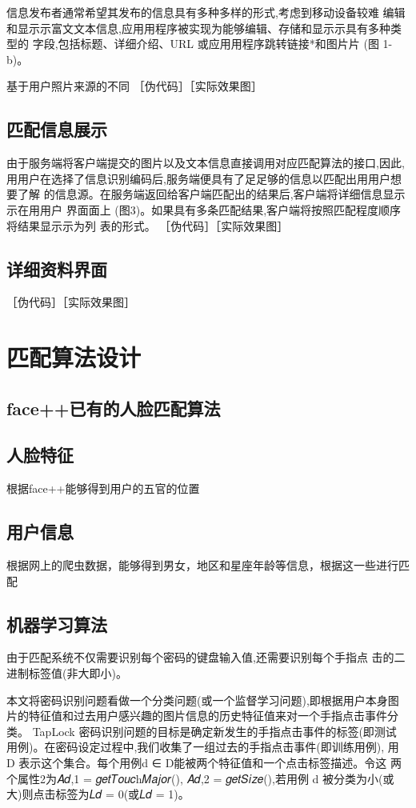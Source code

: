 信息发布者通常希望其发布的信息具有多种多样的形式,考虑到移动设备较难 编辑和显⽰示富⽂文本信息,应⽤用程序被实现为能够编辑、存储和显⽰示具有多种类型的 字段,包括标题、详细介绍、URL 或应⽤用程序跳转链接*和图⽚片 (图 1-b)。

基于用户照片来源的不同
［伪代码］［实际效果图］
\subsection{匹配信息展⽰}
由于服务端将客户端提交的图片以及文本信息直接调用对应匹配算法的接口,因此, ⽤用户在选择了信息识别编码后,服务端便具有了⾜足够的信息以匹配出⽤用户想要了解 的信息源。在服务端返回给客户端匹配出的结果后,客户端将详细信息显⽰示在⽤用户 界⾯面上 (图3)。如果具有多条匹配结果,客户端将按照匹配程度顺序将结果显⽰示为列 表的形式。
［伪代码］［实际效果图］
\subsection{详细资料界面}
［伪代码］［实际效果图］


\section{}

\section{匹配算法设计}
\subsection{face++已有的人脸匹配算法}
\subsection{人脸特征}
根据face++能够得到用户的五官的位置
\subsection{用户信息}
根据网上的爬虫数据，能够得到男女，地区和星座年龄等信息，根据这一些进行匹配
\subsection{机器学习算法}
由于匹配系统不仅需要识别每个密码的键盘输入值,还需要识别每个手指点 击的二进制标签值(非大即小)。

本文将密码识别问题看做一个分类问题(或一个监督学习问题),即根据用户本身图片的特征值和过去用户感兴趣的图片信息的历史特征值来对一个手指点击事件分类。
TapLock 密码识别问题的目标是确定新发生的手指点击事件的标签(即测试 用例)。在密码设定过程中,我们收集了一组过去的手指点击事件(即训练用例), 用 D 表示这个集合。每个用例d ∈ D能被两个特征值和一个点击标签描述。令这 两个属性2为𝐴𝑑,1 = 𝑔𝑒𝑡𝑇𝑜𝑢𝑐h𝑀𝑎𝑗𝑜𝑟(), 𝐴𝑑,2 = 𝑔𝑒𝑡𝑆𝑖𝑧𝑒(),若用例 d 被分类为小(或 大)则点击标签为𝐿𝑑 = 0(或𝐿𝑑 = 1)。





